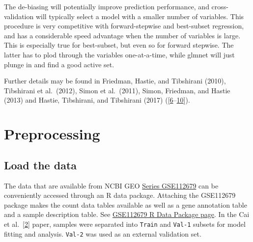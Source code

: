 \documentclass[
]{book}
\begin{document}
The de-biasing will potentially improve prediction performance, and
cross-validation will typically select a model with a smaller number of variables.
This procedure is very competitive with forward-stepwise and
best-subset regression, and has a considerable speed advantage when the
number of variables is large. This is especially true for best-subset,
but even so for forward stepwise. The latter has to plod through the
variables one-at-a-time, while glmnet will just plunge in and find a good active set.

Further details may be found in
Friedman, Hastie, and Tibshirani (2010),
Tibshirani et al.~(2012),
Simon et al.~(2011),
Simon, Friedman, and Hastie (2013) and
Hastie, Tibshirani, and Tibshirani (2017)
({[}\protect\hyperlink{ref-Friedman:2010aa}{6}--\protect\hyperlink{ref-Simon:2013aa}{10}{]}).

\hypertarget{preproc}{%
\chapter{Preprocessing}\label{preproc}}

\hypertarget{load-the-data}{%
\section{Load the data}\label{load-the-data}}

The data that are available from NCBI GEO
\href{https://www.ncbi.nlm.nih.gov/geo/query/acc.cgi?acc=GSE112679}{Series GSE112679}
can be conveniently accessed through an R data package.
Attaching the GSE112679 package makes the count data tables
available as well as a gene annotation table and a sample description table.
See \href{https://12379monty.github.io/GSE112679/}{GSE112679 R Data Package page}.
In the Cai et al.~{[}\protect\hyperlink{ref-Cai:2019aa}{2}{]} paper, samples were separated into
\texttt{Train} and \texttt{Val-1} subsets for model fitting and analysis.
\texttt{Val-2} was used as an external validation set.
\end{document}
